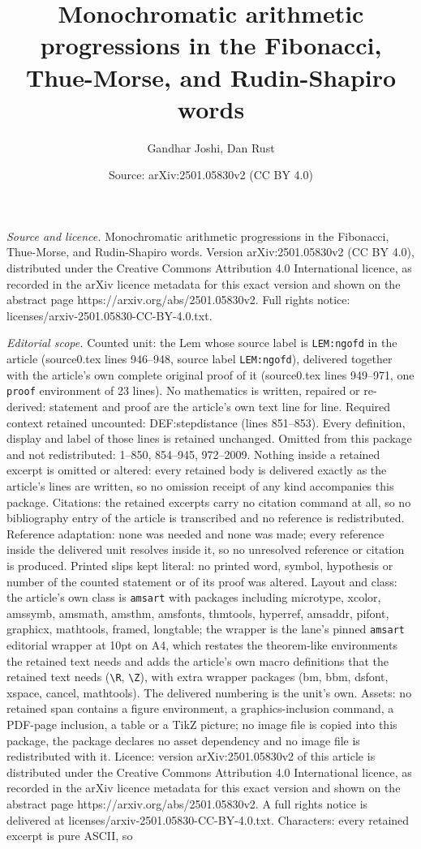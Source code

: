 \documentclass[10pt,a4paper]{amsart}
\title[Monochromatic arithmetic progressions in the Fibonacci, Thue]{Monochromatic arithmetic progressions in the Fibonacci, Thue-Morse, and Rudin-Shapiro words}
\author{Gandhar Joshi, Dan Rust}
\date{Source: arXiv:2501.05830v2 (CC BY 4.0)}
\begin{document}
\maketitle

\noindent\emph{Source and licence.} Monochromatic arithmetic progressions in the Fibonacci, Thue-Morse, and Rudin-Shapiro words. Version arXiv:2501.05830v2 (CC BY 4.0), distributed under the Creative Commons Attribution 4.0 International licence, as recorded in the arXiv licence metadata for this exact version and shown on the abstract page https://arxiv.org/abs/2501.05830v2. Full rights notice: licenses/arxiv-2501.05830-CC-BY-4.0.txt.\par\smallskip

\noindent\textit{Editorial scope.} Counted unit: the Lem whose source label is \texttt{LEM:ngofd} in the article (source0.tex lines 946--948, source label \texttt{LEM:ngofd}), delivered together with the article's own complete original proof of it (source0.tex lines 949--971, one \texttt{proof} environment of 23 lines). No mathematics is written, repaired or re-derived: statement and proof are the article's own text line for line. Required context retained uncounted: DEF:stepdistance (lines 851--853). Every definition, display and label of those lines is retained unchanged. Omitted from this package and not redistributed: 1--850, 854--945, 972--2009. Nothing inside a retained excerpt is omitted or altered: every retained body is delivered exactly as the article's lines are written, so no omission receipt of any kind accompanies this package. Citations: the retained excerpts carry no citation command at all, so no bibliography entry of the article is transcribed and no reference is redistributed. Reference adaptation: none was needed and none was made; every reference inside the delivered unit resolves inside it, so no unresolved reference or citation is produced. Printed slips kept literal: no printed word, symbol, hypothesis or number of the counted statement or of its proof was altered. Layout and class: the article's own class is \texttt{amsart} with packages including microtype, xcolor, amssymb, amsmath, amsthm, amsfonts, thmtools, hyperref, amsaddr, pifont, graphicx, mathtools, framed, longtable; the wrapper is the lane's pinned \texttt{amsart} editorial wrapper at 10pt on A4, which restates the theorem-like environments the retained text needs and adds the article's own macro definitions that the retained text needs (\texttt{\textbackslash R}, \texttt{\textbackslash Z}), with extra wrapper packages (bm, bbm, dsfont, xspace, cancel, mathtools). The delivered numbering is the unit's own. Assets: no retained span contains a figure environment, a graphics-inclusion command, a PDF-page inclusion, a table or a TikZ picture; no image file is copied into this package, the package declares no asset dependency and no image file is redistributed with it. Licence: version arXiv:2501.05830v2 of this article is distributed under the Creative Commons Attribution 4.0 International licence, as recorded in the arXiv licence metadata for this exact version and shown on the abstract page https://arxiv.org/abs/2501.05830v2. A full rights notice is delivered at licenses/arxiv-2501.05830-CC-BY-4.0.txt. Characters: every retained excerpt is pure ASCII, so 
\end{document}
